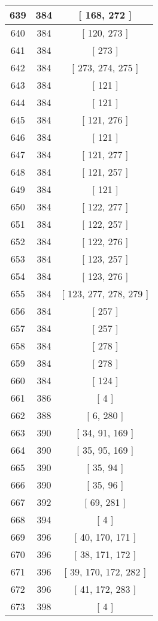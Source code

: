 \begin{center}
\begin{longtable}[H]{|| c c c ||}
\hline
639 & 384 & [ 168, 272 ] \\ 
\hline
640 & 384 & [ 120, 273 ] \\ 
\hline
641 & 384 & [ 273 ] \\ 
\hline
642 & 384 & [ 273, 274, 275 ] \\ 
\hline
643 & 384 & [ 121 ] \\ 
\hline
644 & 384 & [ 121 ] \\ 
\hline
645 & 384 & [ 121, 276 ] \\ 
\hline
646 & 384 & [ 121 ] \\ 
\hline
647 & 384 & [ 121, 277 ] \\ 
\hline
648 & 384 & [ 121, 257 ] \\ 
\hline
649 & 384 & [ 121 ] \\ 
\hline
650 & 384 & [ 122, 277 ] \\ 
\hline
651 & 384 & [ 122, 257 ] \\ 
\hline
652 & 384 & [ 122, 276 ] \\ 
\hline
653 & 384 & [ 123, 257 ] \\ 
\hline
654 & 384 & [ 123, 276 ] \\ 
\hline
655 & 384 & [ 123, 277, 278, 279 ] \\ 
\hline
656 & 384 & [ 257 ] \\ 
\hline
657 & 384 & [ 257 ] \\ 
\hline
658 & 384 & [ 278 ] \\ 
\hline
659 & 384 & [ 278 ] \\ 
\hline
660 & 384 & [ 124 ] \\ 
\hline
661 & 386 & [ 4 ] \\ 
\hline
662 & 388 & [ 6, 280 ] \\ 
\hline
663 & 390 & [ 34, 91, 169 ] \\ 
\hline
664 & 390 & [ 35, 95, 169 ] \\ 
\hline
665 & 390 & [ 35, 94 ] \\ 
\hline
666 & 390 & [ 35, 96 ] \\ 
\hline
667 & 392 & [ 69, 281 ] \\ 
\hline
668 & 394 & [ 4 ] \\ 
\hline
669 & 396 & [ 40, 170, 171 ] \\ 
\hline
670 & 396 & [ 38, 171, 172 ] \\ 
\hline
671 & 396 & [ 39, 170, 172, 282 ] \\ 
\hline
672 & 396 & [ 41, 172, 283 ] \\ 
\hline
673 & 398 & [ 4 ] \\ 

\end{longtable}
\end{center}
